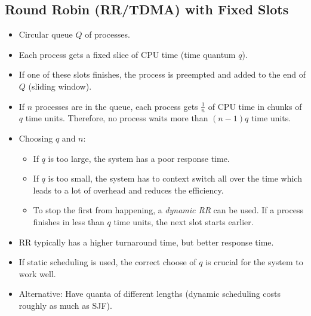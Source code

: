 \documentclass[a4paper, 11pt, accentcolor = tud3b]{tudreport}
\begin{document}
            \subsection{Round Robin (RR/TDMA) with Fixed Slots}
                \begin{itemize}
                	\item Circular queue \(Q\) of processes.
                	\item Each process gets a fixed slice of CPU time (time quantum \(q\)).
	                \item If one of these slots finishes, the process is preempted and added to the end of \(Q\) (sliding window).
	                \item If \(n\) processes are in the queue, each process gets \( \frac{1}{n} \) of CPU time in chunks of \(q\) time units. Therefore, no process waits more than \( (n - 1)q \) time units.
	                \item Choosing \(q\) and \(n\):
		                \begin{itemize}
		                	\item If \(q\) is too large, the system has a poor response time.
		                	\item If \(q\) is too small, the system has to context switch all over the time which leads to a lot of overhead and reduces the efficiency.
		                	\item To stop the first from happening, a \textit{dynamic RR} can be used. If a process finishes in less than \(q\) time units, the next slot starts earlier.
		                \end{itemize}
	                \item RR typically has a higher turnaround time, but better response time.
	                \item If static scheduling is used, the correct choose of \(q\) is crucial for the system to work well.
	                \item Alternative: Have quanta of different lengths (dynamic scheduling costs roughly as much as SJF).
                \end{itemize}
            
\end{document}
